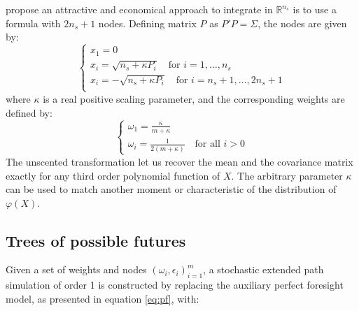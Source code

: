 \documentclass[a4paper,12pt]{amsart}
\begin{document}
\textcite{Julier2000} propose an attractive and economical approach to
integrate in $\mathbb R^{n_s}$ is to use a formula with \(2n_s + 1\)
nodes. Defining matrix $P$ as \(P'P=\Sigma\), the nodes are given by:
\[
   \begin{cases}
      x_1 = 0                                                            \\
      x_{i} = \sqrt{n_s+\kappa P_i}\quad\text{for }i=1,\dots,n_s         \\
      x_{i} = -\sqrt{n_s+\kappa P_i}\quad\text{for }i=n_s+1,\dots,2n_s+1 \\
   \end{cases}
\]
where $\kappa$ is a real positive scaling parameter, and the corresponding weights are defined by:
\[
   \begin{cases}
      \omega_1 = \frac{\kappa}{m+\kappa} \\
      \omega_i = \frac{1}{2(m+\kappa)}\quad\text{for all } i>0
   \end{cases}
\]
The unscented transformation let us recover the mean and the
covariance matrix exactly for any third order polynomial function
of $X$. The arbitrary parameter $\kappa$ can be used to match another
moment or characteristic of the distribution of $\varphi(X)$.\newline

\subsection{Trees of possible futures}

Given a set of weights and
nodes \((\omega_i, \epsilon_i)_{i=1}^m\), a stochastic extended path
simulation of order 1 is constructed by replacing the auxiliary
perfect foresight model, as presented in equation \ref{eq:pf}, with:
\end{document}
